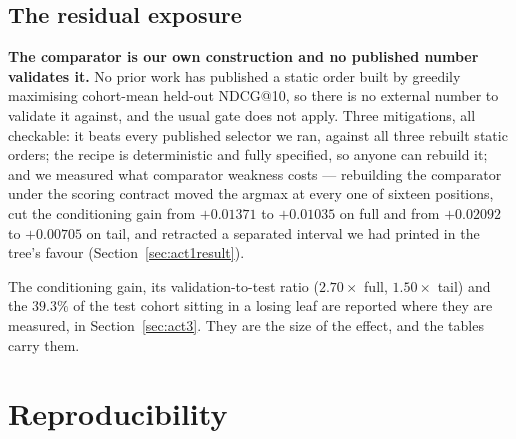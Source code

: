 \documentclass[11pt]{article}
\begin{document}
\subsection{The residual exposure}

\textbf{The comparator is our own construction and no published number validates it.} No prior work has
published a static order built by greedily maximising cohort-mean held-out NDCG@10, so there is no
external number to validate it against, and the usual gate does not apply. Three mitigations, all
checkable: it beats every published selector we ran, against all three rebuilt static orders; the
recipe is deterministic and fully specified, so anyone can rebuild it; and we measured what
comparator weakness costs --- rebuilding the comparator under the
scoring contract moved the argmax at every one of sixteen positions, cut the conditioning gain from
$+0.01371$ to $+0.01035$ on full and from $+0.02092$ to $+0.00705$ on tail, and retracted a
separated interval we had printed in the tree's favour (Section~\ref{sec:act1result}).

The conditioning gain, its validation-to-test ratio ($2.70\times$ full, $1.50\times$ tail) and the
$39.3\%$ of the test cohort sitting in a losing leaf are reported where they are measured, in
Section~\ref{sec:act3}. They are the size of the effect, and the tables carry them.

\section*{Reproducibility}
\end{document}
